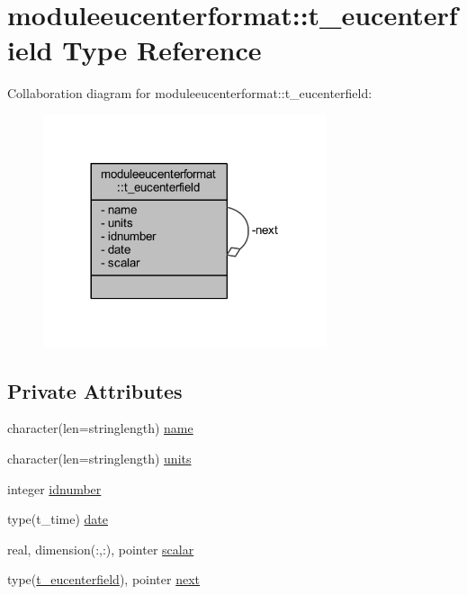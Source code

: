 \hypertarget{structmoduleeucenterformat_1_1t__eucenterfield}{}\section{moduleeucenterformat\+:\+:t\+\_\+eucenterfield Type Reference}
\label{structmoduleeucenterformat_1_1t__eucenterfield}


Collaboration diagram for moduleeucenterformat\+:\+:t\+\_\+eucenterfield\+:\nopagebreak
\begin{figure}[H]
\begin{center}
\leavevmode
\includegraphics[width=236pt]{structmoduleeucenterformat_1_1t__eucenterfield__coll__graph}
\end{center}
\end{figure}
\subsection*{Private Attributes}
\begin{DoxyCompactItemize}
\item 
character(len=stringlength) \mbox{\hyperlink{structmoduleeucenterformat_1_1t__eucenterfield_a668de65642730bcb2d101fb6f205780b}{name}}
\item 
character(len=stringlength) \mbox{\hyperlink{structmoduleeucenterformat_1_1t__eucenterfield_ad37692c2e4a4da29f597ee2f439e2db8}{units}}
\item 
integer \mbox{\hyperlink{structmoduleeucenterformat_1_1t__eucenterfield_a5297e1bb22104b448f5671d6fa4b9be6}{idnumber}}
\item 
type(t\+\_\+time) \mbox{\hyperlink{structmoduleeucenterformat_1_1t__eucenterfield_aa3a52e27dee8d4991ba0303d4ad2fcbc}{date}}
\item 
real, dimension(\+:,\+:), pointer \mbox{\hyperlink{structmoduleeucenterformat_1_1t__eucenterfield_a5333fa8507c4fd5563aae92487af4cf4}{scalar}}
\item 
type(\mbox{\hyperlink{structmoduleeucenterformat_1_1t__eucenterfield}{t\+\_\+eucenterfield}}), pointer \mbox{\hyperlink{structmoduleeucenterformat_1_1t__eucenterfield_ab6519d569c0c511389dac63ece81ff9b}{next}}
\end{DoxyCompactItemize}


